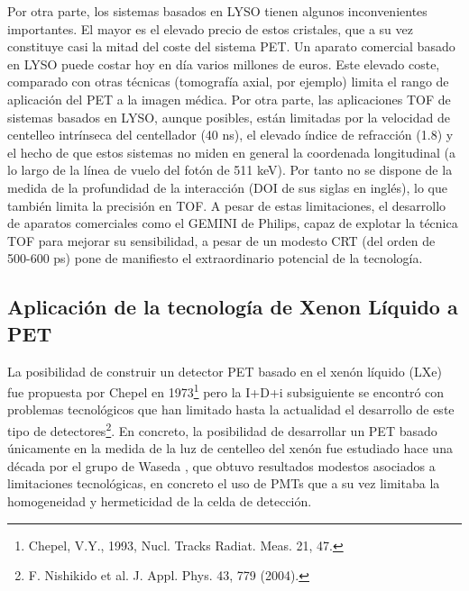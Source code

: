 Por otra parte, los sistemas basados en LYSO tienen algunos inconvenientes importantes. El mayor es el elevado precio de estos cristales, que a su vez constituye casi la mitad del coste del sistema PET. Un aparato comercial basado en LYSO puede costar hoy en día varios millones de euros. Este elevado coste, comparado con otras técnicas (tomografía axial, por ejemplo) limita el rango de aplicación del PET a la imagen médica. Por otra parte, las aplicaciones TOF de sistemas basados en LYSO, aunque posibles, están limitadas por la velocidad de centelleo intrínseca del centellador (40 ns), el elevado índice de refracción (1.8)  y el hecho de que estos sistemas no miden en general la coordenada longitudinal (a lo largo de la línea de vuelo del fotón de 511 keV). Por tanto no se dispone de la medida de la profundidad de la interacción (DOI de sus siglas en inglés), lo que también limita la precisión en TOF. A pesar de estas limitaciones, el desarrollo de aparatos comerciales como el GEMINI de Philips, capaz de explotar la técnica TOF para mejorar su sensibilidad, a pesar de un modesto CRT (del orden de 500-600 ps) pone de manifiesto el extraordinario potencial de la tecnología.

\subsection*{Aplicación de la tecnología de Xenon Líquido a PET}

La posibilidad de construir un detector PET basado en el xenón líquido (LXe) fue propuesta por Chepel en 1973\footnote{Chepel, V.Y., 1993, Nucl. Tracks Radiat. Meas. 21, 47.}  pero la I+D+i subsiguiente se encontró con problemas tecnológicos que han limitado hasta la actualidad el desarrollo de este tipo de detectores\footnote{F. Nishikido et al. J. Appl. Phys. 43, 779 (2004).}. En concreto, la posibilidad de desarrollar un PET basado únicamente en la medida de la luz de centelleo del xenón fue estudiado hace una década por el grupo de Waseda , que obtuvo resultados modestos asociados a limitaciones tecnológicas, en concreto el uso de PMTs que a su vez limitaba la homogeneidad y hermeticidad de la celda de detección. 

